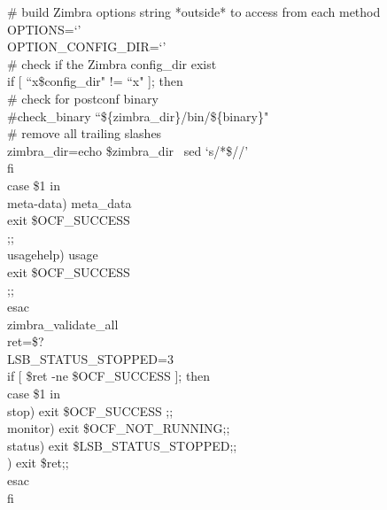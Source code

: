 \documentclass[a4paper, 12pt]{book}
\begin{document}
\noindent \# build Zimbra options string *outside* to access from each method\\
OPTIONS=`'\\
OPTION\_CONFIG\_DIR=`'\\

\noindent \# check if the Zimbra config\_dir exist\\
if [ ``x\$config\_dir" != ``x" ]; then\\
    \indent \# check for postconf binary\\
    \indent \#check\_binary ``\$\{zimbra\_dir\}/bin/\$\{binary\}"\\

    \# remove all trailing slashes\\
    \indent zimbra\_dir=\textasciigrave echo \$zimbra\_dir \textbar \ sed `s/\/*\$//'\textasciigrave \\
fi\\

\noindent case \$1 in\\
    \indent meta-data)  meta\_data\\
                \indent \indent \indent \indent exit \$OCF\_SUCCESS\\
                \indent \indent \indent \indent ;;\\

    \indent usage\textbar help) usage\\
                \indent \indent \indent \indent exit \$OCF\_SUCCESS\\
                \indent \indent \indent \indent ;;\\
\noindent esac\\

\noindent zimbra\_validate\_all\\
ret=\$?\\

\noindent LSB\_STATUS\_STOPPED=3\\
if [ \$ret -ne \$OCF\_SUCCESS ]; then\\
    \indent case \$1 in\\
    \indent \indent stop)       exit \$OCF\_SUCCESS ;;\\
    \indent \indent monitor)    exit \$OCF\_NOT\_RUNNING;;\\
    \indent \indent status)     exit \$LSB\_STATUS\_STOPPED;;\\
    \indent \indent *)          exit \$ret;;\\
    \indent esac\\
fi\\
\end{document}
